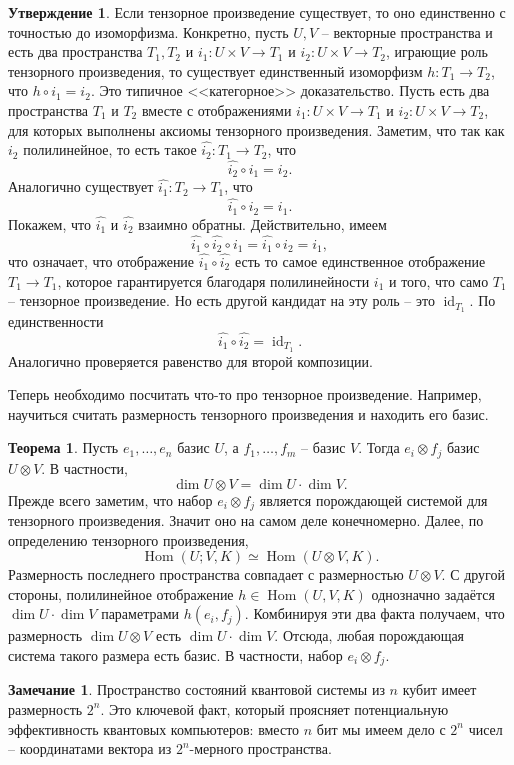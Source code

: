 \documentclass[12pt,a4paper,oneside]{book}
\theoremstyle{definition}
\newtheorem*{rem}{\color{green!50!blue}Замечание}
\newtheorem{thm}{\color{red!40!black}Теорема}
\newtheorem{utvr}{\color{blue!50!black}Утверждение}
\newcommand{\id}{\operatorname{id}}
\newcommand{\Hom}{\operatorname{Hom}}
\def\thrm{\begin{thm}}
\def\ethrm{\end{thm}}
\def\rm{\begin{rem}}
\def\erm{\end{rem}}
\def\utv{\begin{utvr}}
\def\eutv{\end{utvr}}
\begin{document}
\utv Если тензорное произведение существует, то оно единственно с точностью до изоморфизма. Конкретно, пусть $U,V$ -- векторные пространства и есть два пространства $T_1,T_2$ и $i_1 \colon U\times V \to T_1$ и $i_2\colon U\times V \to T_2$, играющие роль тензорного произведения, то существует единственный изоморфизм $h\colon T_1\to T_2$, что $h\circ i_1=i_2$.
\proof Это типичное <<категорное>> доказательство. Пусть есть два пространства $T_1$ и $T_2$ вместе с отображениями $i_1 \colon U\times V \to T_1$ и $i_2 \colon  U\times V \to T_2$, для которых выполнены аксиомы тензорного произведения. Заметим, что так как $i_2$ полилинейное, то есть такое $\hat{i_2} \colon T_1 \to T_2$, что $$\hat{i_2}\circ i_1= i_2.$$ 
Аналогично существует $\hat{i_1} \colon T_2 \to T_1$, что
$$\hat{i_1}\circ i_2= i_1.$$ 
Покажем, что $\hat{i_1} $ и $\hat{i_2}$ взаимно обратны. Действительно, имеем
$$\hat{i_1}\circ \hat{i_2}\circ i_1= \hat{i_1}\circ i_2= i_1,$$
что означает, что отображение $\hat{i_1}\circ \hat{i_2}$ есть то самое единственное отображение $T_1\to T_1$, которое гарантируется благодаря полилинейности $i_1$ и того, что само $T_1$ -- тензорное произведение. Но есть другой кандидат на эту роль -- это $\id_{T_1}$. По единственности 
$$\hat{i_1}\circ \hat{i_2}=\id_{T_1}.$$
Аналогично проверяется равенство для второй композиции.
\endproof
\eutv





Теперь необходимо посчитать что-то про тензорное произведение. Например, научиться считать размерность тензорного произведения и находить его базис.
\thrm Пусть $e_1,\dots,e_n$ базис $U$, а $f_1,\dots,f_m$ -- базис $V$. Тогда $e_i\otimes f_j$ базис $U \otimes V$. В частности, 
$$\dim U \otimes V= \dim U \cdot \dim V.$$ 
\proof Прежде всего заметим, что набор $e_i \otimes f_j$ является порождающей системой для тензорного произведения. Значит оно на самом деле конечномерно. Далее, по определению тензорного произведения,
$$\Hom(U;V, K) \simeq \Hom(U\otimes  V,K).$$
Размерность последнего пространства совпадает с размерностью $U\otimes V$. С другой стороны, полилинейное отображение $h \in \Hom(U,V, K)$ однозначно задаётся $\dim U \cdot \dim V$  параметрами $h(e_i,f_j)$. Комбинируя эти два факта получаем, что размерность $\dim U \otimes V$ есть $\dim U \cdot \dim V$. Отсюда, любая порождающая система такого размера есть базис. В частности, набор $e_i \otimes f_j$.
\endproof
\ethrm


\rm Пространство состояний квантовой системы из $n$ кубит имеет размерность $2^n$. Это ключевой факт, который проясняет потенциальную эффективность квантовых компьютеров: вместо $n$ бит мы имеем дело с $2^n$ чисел -- координатами вектора из $2^n$-мерного пространства.
\erm
\end{document}
